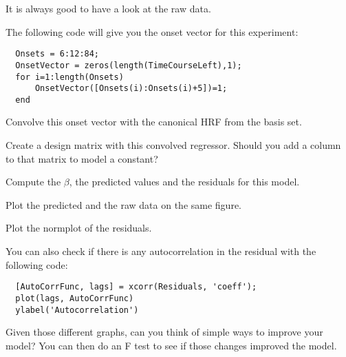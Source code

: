\documentclass[a4paper,10pt]{article}
\begin{document}
It is always good to have a look at the raw data.

The following code will give you the onset vector for this experiment:
\begin{verbatim}
  Onsets = 6:12:84;
  OnsetVector = zeros(length(TimeCourseLeft),1);
  for i=1:length(Onsets)
      OnsetVector([Onsets(i):Onsets(i)+5])=1;
  end
\end{verbatim}

Convolve this onset vector with the canonical HRF from the basis set.

Create a design matrix with this convolved regressor. Should you add a column to that matrix to model a constant?

Compute the $\beta$, the predicted values and the residuals for this model.

Plot the predicted and the raw data on the same figure.

Plot the normplot of the residuals.

You can also check if there is any autocorrelation in the residual with the following code:
\begin{verbatim}
  [AutoCorrFunc, lags] = xcorr(Residuals, 'coeff');
  plot(lags, AutoCorrFunc)
  ylabel('Autocorrelation')
\end{verbatim}

Given those different graphs, can you think of simple ways to improve your model? You can then do an F test to see if those changes improved the model.
\end{document}
